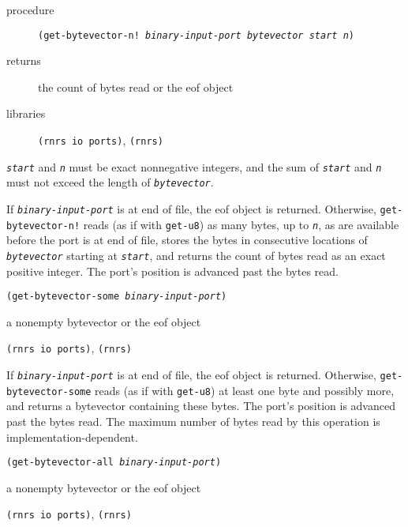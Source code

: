 \begin{description}

\label{io_s58}\item[procedure] \texttt{(get-bytevector-n! \textit{binary-input-port} \textit{bytevector} \textit{start} \textit{n})}



\item[returns] the count of bytes read or the eof object


\item[libraries] \texttt{(rnrs io ports)}, \texttt{(rnrs)}
\end{description}

\texttt{\textit{start}} and \texttt{\textit{n}} must be exact nonnegative integers, and the sum of
\texttt{\textit{start}} and \texttt{\textit{n}} must not exceed the length of \texttt{\textit{bytevector}}.

If \texttt{\textit{binary-input-port}} is at end of file, the eof object is returned.
Otherwise, \texttt{get-bytevector-n!} reads (as if with \texttt{get-u8})
as many bytes, up to \texttt{\textit{n}}, as are available before the port is at end
of file, stores the bytes in consecutive locations of \texttt{\textit{bytevector}}
starting at \texttt{\textit{start}}, and returns the count of bytes read as an exact
positive integer.
The port's position is advanced past the bytes read.


\begin{description}

\label{io_s59}\item[procedure] \texttt{(get-bytevector-some \textit{binary-input-port})}



\item[returns] a nonempty bytevector or the eof object


\item[libraries] \texttt{(rnrs io ports)}, \texttt{(rnrs)}
\end{description}


If \texttt{\textit{binary-input-port}} is at end of file, the eof object is returned.
Otherwise, \texttt{get-bytevector-some} reads (as if with \texttt{get-u8})
at least one byte and possibly more, and returns a bytevector containing
these bytes.
The port's position is advanced past the bytes read.
The maximum number of bytes read by this operation is implementation-dependent.


\begin{description}

\label{io_s60}\item[procedure] \texttt{(get-bytevector-all \textit{binary-input-port})}



\item[returns] a nonempty bytevector or the eof object


\item[libraries] \texttt{(rnrs io ports)}, \texttt{(rnrs)}
\end{description}


